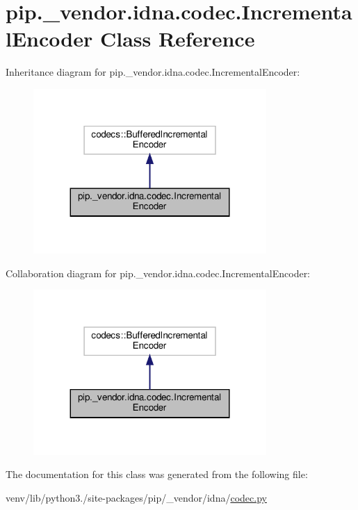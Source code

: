 \hypertarget{classpip_1_1__vendor_1_1idna_1_1codec_1_1IncrementalEncoder}{}\section{pip.\+\_\+vendor.\+idna.\+codec.\+Incremental\+Encoder Class Reference}
\label{classpip_1_1__vendor_1_1idna_1_1codec_1_1IncrementalEncoder}


Inheritance diagram for pip.\+\_\+vendor.\+idna.\+codec.\+Incremental\+Encoder\+:
\nopagebreak
\begin{figure}[H]
\begin{center}
\leavevmode
\includegraphics[width=251pt]{classpip_1_1__vendor_1_1idna_1_1codec_1_1IncrementalEncoder__inherit__graph}
\end{center}
\end{figure}


Collaboration diagram for pip.\+\_\+vendor.\+idna.\+codec.\+Incremental\+Encoder\+:
\nopagebreak
\begin{figure}[H]
\begin{center}
\leavevmode
\includegraphics[width=251pt]{classpip_1_1__vendor_1_1idna_1_1codec_1_1IncrementalEncoder__coll__graph}
\end{center}
\end{figure}


The documentation for this class was generated from the following file\+:\begin{DoxyCompactItemize}
\item 
venv/lib/python3./site-\/packages/pip/\+\_\+vendor/idna/\hyperlink{codec_8py}{codec.\+py}\end{DoxyCompactItemize}
